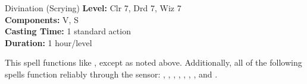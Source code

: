 {Divination (Scrying)}
{
	\textbf{Level:}
	Clr 7, Drd 7, Wiz 7\\
	\textbf{Components:}
	V, S\\
	\textbf{Casting Time:}
	1 standard action\\
	\textbf{Duration:}
	1 hour/level\\
}
{
	This spell functions like , except as noted above. Additionally, all of the following spells function reliably through the sensor: , , , , , , , and .

}
